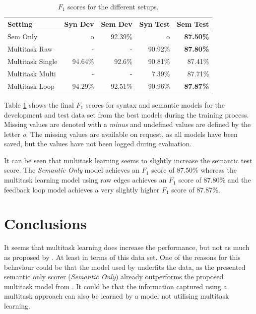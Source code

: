 \documentclass[11pt]{scrartcl}
\begin{document}
\begin{table}[h]
    \centering
    \begin{tabular}{l|r|r|r|r}
        Setting & \textbf{Syn Dev} & \textbf{Sem Dev} & \textbf{Syn Test} & \textbf{Sem Test} \\ \hline
        Sem Only & o & 92.39\% & o & \textbf{87.50\%} \\ 
        Multitask Raw & - & - & 90.92\% & \textbf{87.80\%} \\
        Multitask Single & 94.64\% & 92.6\% & 90.81\% & 87.41\% \\
        Multitask Multi & - & - & 7.39\% & 87.71\% \\
        Multitask Loop & 94.29\% & 92.51\% & 90.96\% & \textbf{87.87\%} \\
    \end{tabular}
    \caption{$F_1$ scores for the different setups.}
    \label{tab:results}
\end{table}

Table \ref{tab:results} shows the final $F_1$ scores for syntax and semantic models for the development and test data set from the best models during the training process. Missing values are denoted with a \textit{minus} and undefined values are defined by the letter \textit{o}. The missing values are available on request, as all models have been saved, but the values have not been logged during evaluation.

It can be seen that multitask learning seems to slightly increase the semantic test score. The \textit{Semantic Only} model achieves an $F_1$ score of $87.50\%$ whereas the multitask learning model using raw edges achieves an $F_1$ score of $87.80\%$ and the feedback loop model achieves a very slightly higher $F_1$ score of $87.87\%$.

\section{Conclusions}

It seems that multitask learning does increase the performance, but not as much as proposed by \cite{peng-etal-2017-deep}. At least in terms of this data set. One of the reasons for this behaviour could be that the model used by \cite{peng-etal-2017-deep} underfits the data, as the presented semantic only scorer (\textit{Semantic Only}) already outperforms the proposed multitask model from \cite{peng-etal-2017-deep}. It could be that the information captured using a multitask approach can also be learned by a model not utilising multitask learning.
\end{document}
